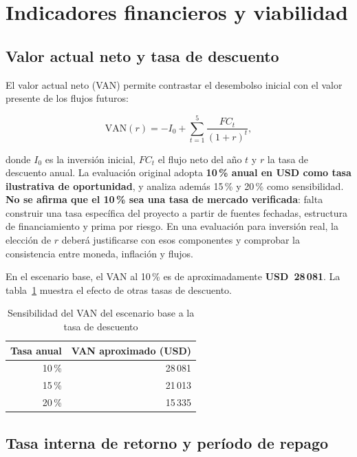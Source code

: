 \section{Indicadores financieros y viabilidad}\label{sec:ml-indicadores-financieros}

\subsection{Valor actual neto y tasa de descuento}

El valor actual neto (VAN) permite contrastar el desembolso inicial con el valor presente de los flujos futuros:

\begin{equation}
\mathrm{VAN}(r)=-I_0+\sum_{t=1}^{5}\frac{FC_t}{(1+r)^t},\label{eq:ml-van}
\end{equation}

\noindent donde $I_0$ es la inversión inicial, $FC_t$ el flujo neto del año $t$ y $r$ la tasa de descuento anual. La evaluación original adopta \textbf{10\,\% anual en USD como tasa ilustrativa de oportunidad}, y analiza además 15\,\% y 20\,\% como sensibilidad. \textbf{No se afirma que el 10\,\% sea una tasa de mercado verificada}: falta construir una tasa específica del proyecto a partir de fuentes fechadas, estructura de financiamiento y prima por riesgo. En una evaluación para inversión real, la elección de $r$ deberá justificarse con esos componentes y comprobar la consistencia entre moneda, inflación y flujos.

En el escenario base, el VAN al 10\,\% es de aproximadamente \textbf{USD~28\,081}. La tabla~\ref{tab:ml-van-sensibilidad} muestra el efecto de otras tasas de descuento.

\begin{table}[htbp]
\centering
\caption{Sensibilidad del VAN del escenario base a la tasa de descuento}
\label{tab:ml-van-sensibilidad}
\small
\begin{tabular}{@{}rr@{}}
\toprule
\textbf{Tasa anual} & \textbf{VAN aproximado (USD)} \\
\midrule
10\,\% & 28\,081 \\
15\,\% & 21\,013 \\
20\,\% & 15\,335 \\
\bottomrule
\end{tabular}
\end{table}

\subsection{Tasa interna de retorno y período de repago}

